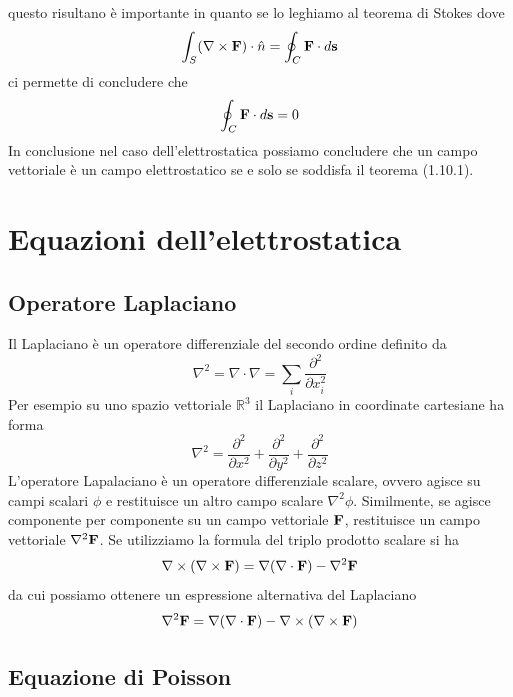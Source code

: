questo risultano \`e importante in quanto se lo leghiamo al teorema di Stokes dove
\begin{equation*}
	\int_{S}(\nabla \times \bold{F})\cdot \hat{n} = \oint_{C} \bold{F} \cdot d\bold{s}
\end{equation*}
ci permette di concludere che 
\begin{equation*}
	\oint_{C} \bold{F} \cdot d\bold{s} = 0
\end{equation*}
In conclusione nel caso dell'elettrostatica possiamo concludere che un campo vettoriale \`e un campo elettrostatico se e solo se soddisfa il teorema (1.10.1).
\newpage


\section{Equazioni dell'elettrostatica}

\subsection{Operatore Laplaciano}

Il Laplaciano \`e un operatore differenziale del secondo ordine definito da 
\begin{equation*}
	\nabla^2 = \nabla \cdot \nabla = \sum_{i}\frac{\partial^2}{\partial x_i^2}
\end{equation*}
Per esempio su uno spazio vettoriale $\mathbb{R}^3$ il Laplaciano in coordinate cartesiane ha forma
\begin{equation*}
	\nabla^2 = \frac{\partial^2}{\partial x^2} + \frac{\partial^2}{\partial y^2 } + \frac{\partial^2}{\partial z^2}
\end{equation*}
L'operatore Lapalaciano \`e un operatore differenziale scalare, ovvero agisce su campi scalari $\phi$ e restituisce un altro campo scalare $\nabla^2\phi$. Similmente, se agisce componente per componente su un campo vettoriale $\bold{F}$, restituisce un campo vettoriale $\nabla^2\bold{F}$. Se utilizziamo la formula del triplo prodotto scalare si ha 
\begin{equation*}
	\nabla \times (\nabla \times \bold{F}) = \nabla(\nabla \cdot \bold{F} ) - \nabla^2 \bold{F}
\end{equation*}
da cui possiamo ottenere un espressione alternativa del Laplaciano
\begin{equation*}
	\nabla^2 \bold{F} = \nabla(\nabla \cdot \bold{F}) - \nabla \times (\nabla \times \bold{F})
\end{equation*}
\subsection{Equazione di Poisson}

